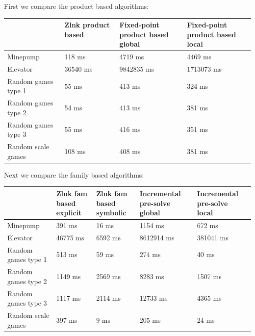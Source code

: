 First we compare the product based algorithms:\\
\begin{tabular}{|l|l|l|l|}
	\hline
	& \shortstack{Zlnk product based\\\ } & \shortstack{Fixed-point product based\\global} & \shortstack{Fixed-point product based\\local} \\ \hline
	Minepump& 118 ms& 4719 ms& 4469 ms\\ \hline
	Elevator& 36540 ms& 9842835 ms& 1713073 ms\\ \hline
	Random games type 1& 55 ms& 413 ms& 324 ms\\ \hline
	Random games type 2& 54 ms& 413 ms& 381 ms\\ \hline
	Random games type 3& 55 ms& 416 ms& 351 ms\\ \hline
	Random scale games& 108 ms& 408 ms& 381 ms\\ \hline
\end{tabular}

Next we compare the family based algorithms:\\
\begin{tabular}{|l|l|l|l|l|}
	\hline
	& \shortstack{Zlnk fam based\\ explicit} & \shortstack{Zlnk fam based\\symbolic} & \shortstack{Incremental pre-solve\\global} & \shortstack{Incremental pre-solve\\local} \\ \hline
	Minepump& 391 ms& 16 ms& 1154 ms& 672 ms\\ \hline
	Elevator& 46775 ms& 6592 ms& 8612914 ms& 381041 ms\\ \hline
	Random games type 1& 513 ms& 59 ms& 274 ms& 40 ms\\ \hline
	Random games type 2& 1149 ms& 2569 ms& 8283 ms& 1507 ms\\ \hline
	Random games type 3& 1117 ms& 2114 ms& 12733 ms& 4365 ms\\ \hline
	Random scale games& 397 ms& 9 ms& 205 ms& 24 ms\\ \hline
\end{tabular}